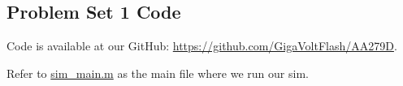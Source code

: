 \subsection{Problem Set 1 Code}

Code is available at our GitHub: \href{https://github.com/GigaVoltFlash/AA279D}{https://github.com/GigaVoltFlash/AA279D}.

Refer to \href{https://github.com/GigaVoltFlash/AA279D/blob/main/sim/sim_main.m}{sim\_main.m} as the main file where we run our sim.
